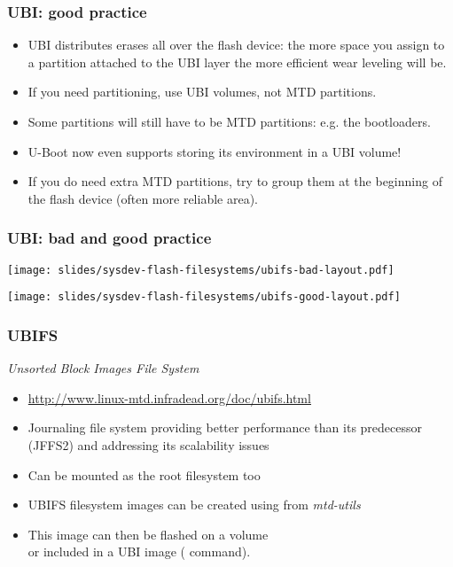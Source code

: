 \begin{frame}
  \frametitle{UBI: good practice}
  \begin{itemize}
  \item UBI distributes erases all over the flash device: the more space
    you assign to a partition attached to the UBI layer the more efficient
    wear leveling will be.
  \item If you need partitioning, use UBI volumes, not MTD partitions.
  \item Some partitions will still have to be MTD partitions: e.g. the
    bootloaders.
  \item U-Boot now even supports storing its environment in a UBI volume!
  \item If you do need extra MTD partitions, try to group them at the
    beginning of the flash device (often more reliable area).
  \end{itemize}
\end{frame}

\begin{frame}
  \frametitle{UBI: bad and good practice}
  \begin{center}
    \texttt{[image: slides/sysdev-flash-filesystems/ubifs-bad-layout.pdf]}
  \end{center}

  \begin{center}
    \texttt{[image: slides/sysdev-flash-filesystems/ubifs-good-layout.pdf]}
  \end{center}
\end{frame}

\begin{frame}
  \frametitle{UBIFS}
  {\em Unsorted Block Images File System}
  \begin{itemize}
  \item \url{http://www.linux-mtd.infradead.org/doc/ubifs.html}
  \item Journaling file system providing better performance than
        its predecessor (JFFS2) and addressing its scalability issues
  \item Can be mounted as the root filesystem too
  \item UBIFS filesystem images can be created using 
        from {\em mtd-utils}
  \item This image can then be flashed on a volume\\
        or included in a UBI image ( command).
  \end{itemize}
\end{frame}

